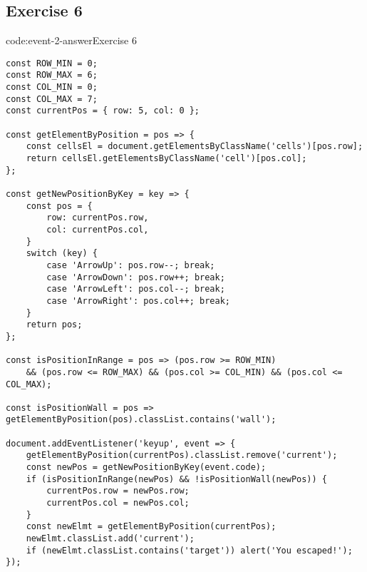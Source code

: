 \subsection*{Exercise 6}

\begin{codeenv}{code:event-2-answer}{Exercise 6}\begin{verbatim}
const ROW_MIN = 0;
const ROW_MAX = 6;
const COL_MIN = 0;
const COL_MAX = 7;
const currentPos = { row: 5, col: 0 };

const getElementByPosition = pos => {
    const cellsEl = document.getElementsByClassName('cells')[pos.row];
    return cellsEl.getElementsByClassName('cell')[pos.col];
};

const getNewPositionByKey = key => {
    const pos = {
        row: currentPos.row,
        col: currentPos.col,
    }
    switch (key) {
        case 'ArrowUp': pos.row--; break;
        case 'ArrowDown': pos.row++; break;
        case 'ArrowLeft': pos.col--; break;
        case 'ArrowRight': pos.col++; break;
    }
    return pos;
};

const isPositionInRange = pos => (pos.row >= ROW_MIN)
    && (pos.row <= ROW_MAX) && (pos.col >= COL_MIN) && (pos.col <= COL_MAX);

const isPositionWall = pos => getElementByPosition(pos).classList.contains('wall');

document.addEventListener('keyup', event => {
    getElementByPosition(currentPos).classList.remove('current');
    const newPos = getNewPositionByKey(event.code);
    if (isPositionInRange(newPos) && !isPositionWall(newPos)) {
        currentPos.row = newPos.row;
        currentPos.col = newPos.col;
    }
    const newElmt = getElementByPosition(currentPos);
    newElmt.classList.add('current');
    if (newElmt.classList.contains('target')) alert('You escaped!');
});
\end{verbatim}
\end{codeenv}
